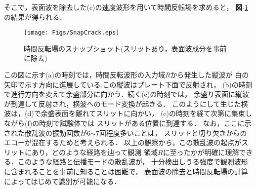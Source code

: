 そこで，表面波を除去した(c)の速度波形を用いて時間反転場を求めると，
{\bf 図}-\ref{fig:snap_crack}の結果が得られる．
\begin{figure}[thb]
\centering
	\texttt{[image: Figs/SnapCrack.eps]}
	\caption{時間反転場のスナップショット(スリットあり，表面波成分を事前に除去)}
	\label{fig:snap_crack}
\end{figure}
この図に示す(a)の時刻では，時間反転波形の入力域$R$から発生した縦波が
白の矢印で示す方向に進展している.この縦波はプレート下面で反射され，
(b)の時刻で進行方向を変えて余盛部分に向かう．続く(c)の時刻では，
余盛り表面に縦波が到達して反射され，横波へのモード変換が起きる．
このようにして生じた横波は，(d)で余盛表面を離れてスリットに向かい，
(e)の時刻を経て次第に集束しながら(f)の時刻で試験体では
スリットがある位置に到達する．
%
なお，ここに示された散乱波の振動回数が6$\sim$7回程度多いことは，
スリットと切り欠きからのエコーが混在するためと考えられる．
%
以上の観察から，この散乱波の起点がスリットにあり，どのような経路を辿って観測
領域$R$に至ったかが明確に理解できる．このような経路と伝播モードの散乱波が，
十分検出しうる強度で観測波形に含まれることを事前に知ることは困難で，
表面波の除去と時間反転場の計算によってはじめて識別が可能になる．
